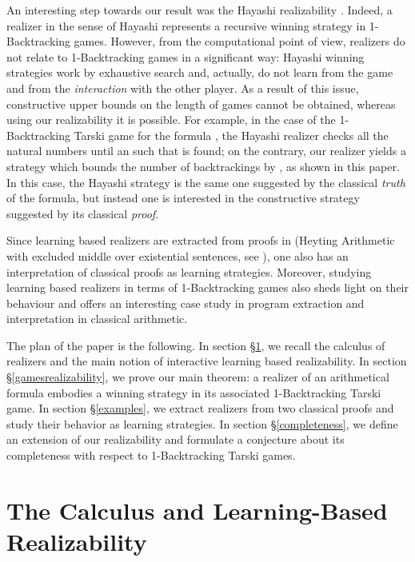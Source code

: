 \documentclass[copyright,creativecommons]{eptcs}
\begin{document}
An interesting step towards our result was the Hayashi realizability \cite{Hayashi1}. Indeed, a realizer in the sense of Hayashi  represents a recursive winning strategy in 1-Backtracking games. However, from the computational point of view,  realizers do not relate to 1-Backtracking games in a significant way: Hayashi winning strategies work by exhaustive search and, actually, do not learn from the game and from the \emph{interaction} with the other player. As a result of this issue, constructive upper bounds on the length of games cannot be obtained, whereas using our realizability it is possible. For example, in the case of the 1-Backtracking Tarski game for the formula , the Hayashi realizer checks all the natural numbers until an  such that  is found; on the contrary, our realizer yields a strategy which bounds the number of backtrackings by , as shown in this paper. In this case, the Hayashi strategy is the same one suggested by the classical \emph{truth} of the formula, but instead one is interested in the constructive strategy suggested by its classical \emph{proof}.

Since learning based realizers are extracted from proofs in  (Heyting Arithmetic with excluded middle over existential sentences, see \cite{Aschieri}), one also has an interpretation of classical proofs as learning strategies. Moreover, studying  learning based realizers in terms of 1-Backtracking games also sheds light on their behaviour and offers an interesting case study in program extraction and interpretation in classical arithmetic. 

The plan of the paper is the following. In section \S \ref{calculusandrealizability}, we recall the calculus of realizers and the main notion of interactive learning based realizability. In section \S \ref{gamesrealizability}, we prove our main theorem: a realizer of an arithmetical formula embodies a winning strategy in its associated 1-Backtracking Tarski game. In section \S \ref{examples}, we extract realizers from two classical proofs and study their behavior as learning strategies. In section \S \ref{completeness}, we define an extension of our realizability and formulate a conjecture about its completeness with respect to 1-Backtracking Tarski games.



\section{The Calculus  and Learning-Based Realizability}\label{calculusandrealizability}
\end{document}
